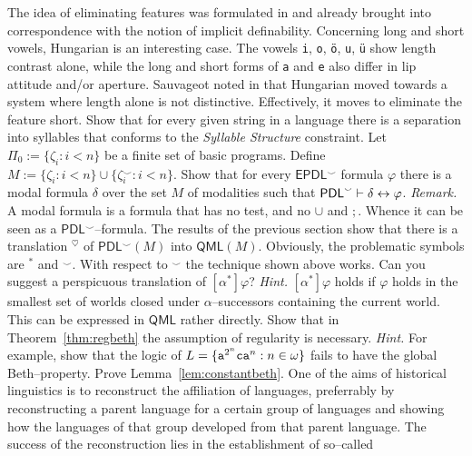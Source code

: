 The idea of eliminating features was
formulated in \cite{kracht:essential} and already brought
into correspondence with the notion of implicit definability.
Concerning long and short vowels, Hungarian is an interesting 
case. The vowels {\tt i}, {\tt o}, {\tt \"o}, {\tt u}, {\tt \"u}
show length contrast alone, while the long and short forms of 
{\tt a} and {\tt e} also differ in lip attitude and/or aperture. 
Sauvageot noted in  that 
Hungarian moved towards a system where length alone is not 
distinctive. Effectively, it moves to eliminate the feature 
\textsf{short}.
\vplatz 
\exercise 
Show that for every given string in a language there is a 
separation into syllables that conforms to the {\sl Syllable 
Structure\/} constraint.
\vplatz
\exercise
Let $\Pi_0 := \{\zeta_i : i < n\}$ be a finite set of basic
programs. Define $M := \{\zeta_i : i < n\} \cup \{\zeta_i^ {\smallsmile}
: i < n\}$. Show that for every $\mathsf{EPDL}^{\smallsmile}$
formula $\varphi$ there is a modal formula $\delta$ over the
set $M$ of modalities such that $\mathsf{PDL}^{\smallsmile}
\vdash \delta \leftrightarrow \varphi$. {\it Remark.} A modal formula is
a formula that has no test, and no $\cup$ and $;$. Whence it
can be seen as a $\mathsf{PDL}^{\smallsmile}$--formula.
\vplatz
\exercise
The results of the previous section show that there is a translation
$^{\heartsuit}$ of $\mathsf{PDL}^{\smallsmile}(M)$ into
$\mathsf{QML}(M)$. Obviously, the problematic symbols are $^{\ast}$
and $^{\smallsmile}$. With respect to $^{\smallsmile}$ the technique
shown above works. Can you suggest a perspicuous translation of
$[\alpha^{\ast}]\varphi$? {\it Hint.} $[\alpha^{\ast}]\varphi$
holds if $\varphi$ holds in the smallest set of worlds closed under
$\alpha$--successors containing the current world. This can be
expressed in $\mathsf{QML}$ rather directly.
\vplatz
\exercise
Show that in Theorem~\ref{thm:regbeth} the assumption of regularity
is necessary. {\it Hint.} For example, show that the logic of
$L = \{\mbox{\tt a}^{2^n}\mbox{\tt c}\mbox{\tt a}^n : n \in
\omega\}$ fails to have the global Beth--property.
\vplatz
\exercise
\label{ex:beth}
Prove Lemma~\ref{lem:constantbeth}.
\vplatz%
\exercise%
One of the aims of historical linguistics is to reconstruct the 
affiliation of languages, preferrably by reconstructing a parent 
language for a certain group of languages and showing how the 
languages of that group developed from that parent language. The 
success of the reconstruction lies in the establishment of so--called 
